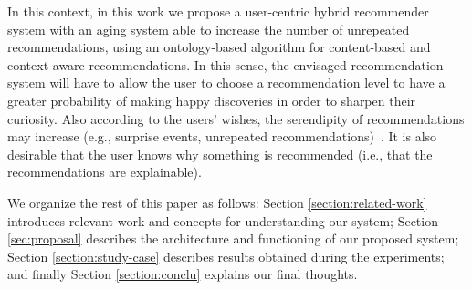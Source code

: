 


In this context, in this work we propose a user-centric hybrid recommender system with an aging system able to increase the number of unrepeated recommendations, using an ontology-based algorithm for content-based and context-aware recommendations. In this sense, the envisaged recommendation system will have to allow the user to choose a recommendation level to have a greater probability of making happy discoveries in order to sharpen their curiosity. Also according to the users’ wishes, the serendipity of recommendations may increase (e.g., surprise events, unrepeated recommendations)~\cite{kotkov2016survey}. It is also desirable that the user knows why something is recommended (i.e., that the recommendations are explainable).

We organize the rest of this paper as follows: Section \ref{section:related-work} introduces relevant work and concepts for understanding our system; Section \ref{sec:proposal} describes the architecture and functioning of our proposed system; Section \ref{section:study-case} describes results obtained during the experiments; and finally Section \ref{section:conclu} explains our final thoughts.


